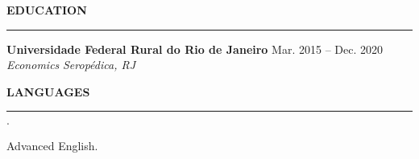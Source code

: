 \documentclass[12pt]{article}
\newenvironment{tightlist}
  {\begin{list}
    {$\cdot$}
    {
      \setlength{\leftmargin}{0em}
      \setlength{\itemsep}{\smallskipamount}
    }
  }
{\end{list}}
\begin{document}
\medskip \textbf{EDUCATION} \medskip
\hrule

\textbf{Universidade Federal Rural do Rio de Janeiro} \hfill {Mar. 2015 -- Dec. 2020} \\
\textit{Economics} \hfill \textit{Seropédica, RJ} {\parfillskip=0pt\par}

\medskip \textbf{LANGUAGES} \medskip
\hrule

\begin{tightlist}
  \item Advanced English.
\end{tightlist}
\end{document}
